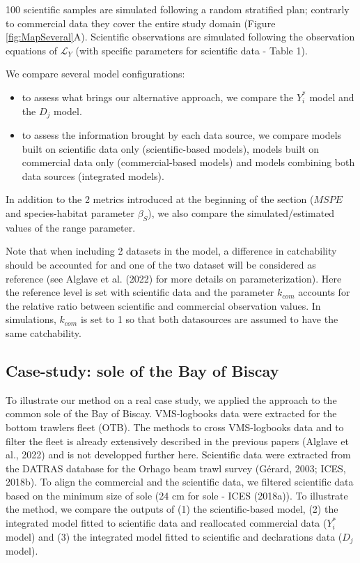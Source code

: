 \documentclass[
  english,
  man,floatsintext]{apa6}
\begin{document}
100 scientific samples are simulated following a random stratified plan; contrarly to commercial data they cover the entire study domain (Figure \ref{fig:MapSeveral}A). Scientific observations are simulated following the observation equations of \(\mathcal{L}_Y\) (with specific parameters for scientific data - Table 1).

We compare several model configurations:

\begin{itemize}
\item
  to assess what brings our alternative approach, we compare the \(Y^*_i\) model and the \(D_j\) model.
\item
  to assess the information brought by each data source, we compare models built on scientific data only (scientific-based models), models built on commercial data only (commercial-based models) and models combining both data sources (integrated models).
\end{itemize}

In addition to the 2 metrics introduced at the beginning of the section (\(MSPE\) and species-habitat parameter \(\beta_S\)), we also compare the simulated/estimated values of the range parameter.

Note that when including 2 datasets in the model, a difference in catchability should be accounted for and one of the two dataset will be considered as reference (see Alglave et al. (2022) for more details on parameterization). Here the reference level is set with scientific data and the parameter \(k_{com}\) accounts for the relative ratio between scientific and commercial observation values. In simulations, \(k_{com}\) is set to 1 so that both datasources are assumed to have the same catchability.

\hypertarget{case-study-sole-of-the-bay-of-biscay}{%
\subsection{Case-study: sole of the Bay of Biscay}\label{case-study-sole-of-the-bay-of-biscay}}

To illustrate our method on a real case study, we applied the approach to the common sole of the Bay of Biscay. VMS-logbooks data were extracted for the bottom trawlers fleet (OTB). The methods to cross VMS-logbooks data and to filter the fleet is already extensively described in the previous papers (Alglave et al., 2022) and is not developped further here. Scientific data were extracted from the DATRAS database for the Orhago beam trawl survey (Gérard, 2003; ICES, 2018b). To align the commercial and the scientific data, we filtered scientific data based on the minimum size of sole (24 cm for sole - ICES (2018a)). To illustrate the method, we compare the outputs of (1) the scientific-based model, (2) the integrated model fitted to scientific data and reallocated commercial data (\(Y^*_i\) model) and (3) the integrated model fitted to scientific and declarations data (\(D_j\) model).
\end{document}
